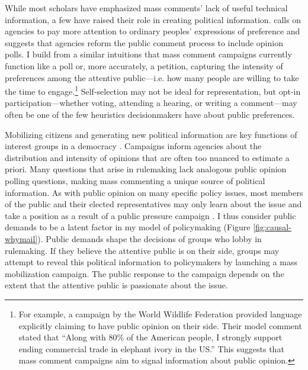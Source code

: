 While most scholars have emphasized mass comments' lack of useful technical information, a few have raised their role in creating political information. \citet{Cuellar2005} calls on agencies to pay more attention to ordinary peoples' expressions of preference and \citet{Rauch2016} suggests that agencies reform the public comment process to include opinion polls. I build from a similar intuitions that mass comment campaigns currently function like a poll or, more accurately, a petition, capturing the intensity of preferences among the attentive public---i.e. how many people are willing to take the time to engage.\footnote{
For example, a campaign by the World Wildlife Federation provided language explicitly claiming to have public opinion on their side. Their model comment stated that ``Along with 80\% of the American people, I strongly support ending commercial trade in elephant ivory in the US.'' This suggests that mass comment campaigns aim to signal information about public opinion.
} 
Self-selection may not be ideal for representation, but opt-in participation---whether voting, attending a hearing, or writing a comment---may often be one of the few heuristics decisionmakers have about public preferences. 

Mobilizing citizens and generating new political information are key functions of interest groups in a democracy \citep{Mansbridge1992, Mahoney2007}. %
Campaigns inform agencies about the distribution and intensity of opinions that are often too nuanced to estimate a priori. Many questions that arise in rulemaking lack analogous public opinion polling questions, making mass commenting a unique source of political information. 
As with public opinion on many specific policy issues,  most members of the public and their elected representatives may only learn about the issue and take a position as a result of a public pressure campaign \citep{Hutchings2003}. I thus consider public demands to be a latent factor in my model of policymaking (Figure \ref{fig:causal-whymail}). Public demands shape the decisions of groups who lobby in rulemaking. If they believe the attentive public is on their side, groups may attempt to reveal this political information to policymakers by launching a mass mobilization campaign. The public response to the campaign depends on the extent that the attentive public is passionate about the issue.%


